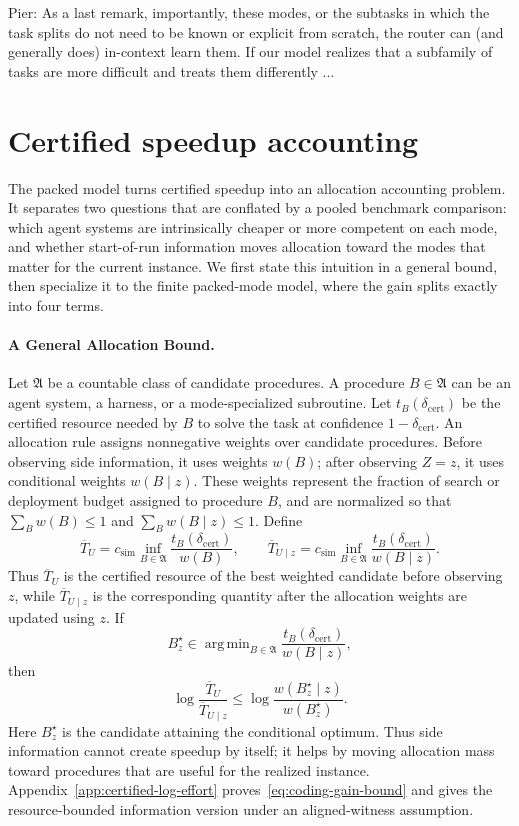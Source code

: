 \documentclass{article}
\newcommand{\pier}[1]{{\color{red}Pier: #1}}
\DeclareMathOperator*{\argmin}{arg\,min}
\begin{document}
\pier{As a last remark, importantly, these modes, or the subtasks in which the task splits do not need to be known or explicit from scratch, the router can (and generally does) in-context learn them. If our model realizes that a subfamily of tasks are more difficult and treats them differently ...}

\section{Certified speedup accounting}
\label{sec:accounting}

The packed model turns certified speedup into an allocation accounting problem.
It separates two questions that are conflated by a pooled benchmark comparison:
which agent systems are intrinsically cheaper or more competent on each mode,
and whether start-of-run information moves allocation toward the modes that
matter for the current instance.  We first state this intuition in a general
bound, then specialize it to the finite packed-mode model, where the gain splits
exactly into four terms.

\paragraph{A General Allocation Bound.}

Let \(\mathfrak A\) be a countable class of candidate procedures.  A procedure
\(B\in\mathfrak A\) can be an agent system, a harness, or a mode-specialized
subroutine.  Let \(t_B(\delta_{\mathrm{cert}})\) be the certified resource needed
by \(B\) to solve the task at confidence \(1-\delta_{\mathrm{cert}}\).
An allocation rule assigns nonnegative weights over candidate procedures.  Before
observing side information, it uses weights \(w(B)\); after observing \(Z=z\),
it uses conditional weights \(w(B\mid z)\).  These weights represent the fraction
of search or deployment budget assigned to procedure \(B\), and are normalized so that
\(\sum_B w(B)\le 1\) and \(\sum_B w(B\mid z)\le 1\).  Define
\[
    \overline T_U
    =
    c_{\mathrm{sim}}
    \inf_{B\in\mathfrak A}
    \frac{t_B(\delta_{\mathrm{cert}})}{w(B)},
    \qquad
    \overline T_{U\mid z}
    =
    c_{\mathrm{sim}}
    \inf_{B\in\mathfrak A}
    \frac{t_B(\delta_{\mathrm{cert}})}{w(B\mid z)} .
\]
Thus \(\overline T_U\) is the certified resource of the best weighted candidate
before observing \(z\), while \(\overline T_{U\mid z}\) is the corresponding
quantity after the allocation weights are updated using \(z\).
If
\[
    B_z^\star
    \in
    \argmin_{B\in\mathfrak A}
    \frac{t_B(\delta_{\mathrm{cert}})}{w(B\mid z)},
\]
then
\begin{equation}
\label{eq:coding-gain-bound}
    \log\frac{\overline T_U}{\overline T_{U\mid z}}
    \le
    \log\frac{w(B_z^\star\mid z)}{w(B_z^\star)} .
\end{equation}
Here \(B_z^\star\) is the candidate attaining the conditional optimum.
Thus side information cannot create speedup by itself; it helps by moving allocation mass
toward procedures that are useful for the realized instance.  Appendix~\ref{app:certified-log-effort}
proves~\eqref{eq:coding-gain-bound} and gives the resource-bounded information version
under an aligned-witness assumption.
\end{document}
